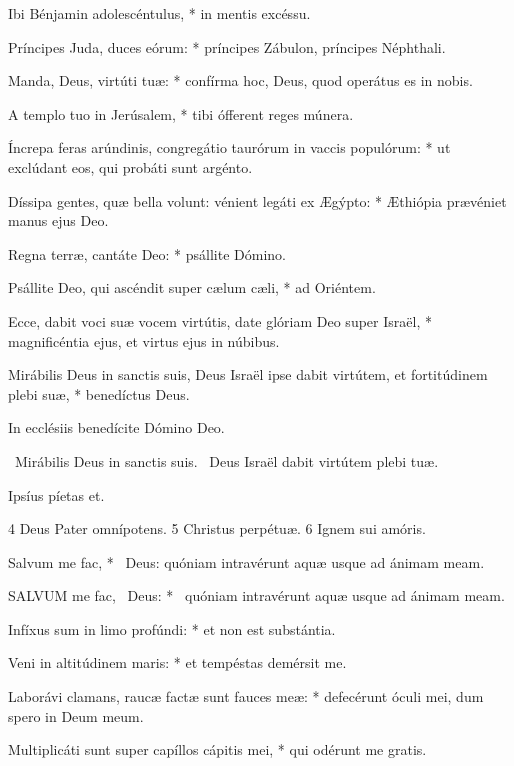 Ibi Bénjamin adolescéntulus, * in mentis excéssu.

Príncipes Juda, duces eórum: * príncipes Zábulon, príncipes Néphthali.

Manda, Deus, virtúti tuæ: * confírma hoc, Deus, quod operátus es in nobis.

A templo tuo in Jerúsalem, * tibi ófferent reges múnera.

Íncrepa feras arúndinis, congregátio taurórum in vaccis populórum: * ut exclúdant eos, qui probáti sunt argénto.

Díssipa gentes, quæ bella volunt: vénient legáti ex Ægýpto: * Æthiópia prævéniet manus ejus Deo.

Regna terræ, cantáte Deo: * psállite Dómino.

Psállite Deo, qui ascéndit super cælum cæli, * ad Oriéntem.

Ecce, dabit voci suæ vocem virtútis, date glóriam Deo super Israël, * magnificéntia ejus, et virtus ejus in núbibus.

Mirábilis Deus in sanctis suis, Deus Israël ipse dabit virtútem, et fortitúdinem plebi suæ, * benedíctus Deus.

 In ecclésiis benedícite Dómino Deo.


\V\ Mirábilis Deus in sanctis suis. \R\ Deus Israël dabit virtútem plebi tuæ.

 Ipsíus píetas et.

 4 Deus Pater omnípotens. 5 Christus perpétuæ. 6 Ignem sui amóris.


 Salvum me fac, * \textdagger\ Deus: quóniam intravérunt aquæ usque ad ánimam meam. \textdaggerdbl


\lettrine[lines=2]{S}{ALVUM} me fac, \textdagger\ Deus: * \textdaggerdbl\ quóniam intravérunt aquæ usque ad ánimam meam.

Infíxus sum in limo profúndi: * et non est substántia.

Veni in altitúdinem maris: * et tempéstas demérsit me.

Laborávi clamans, raucæ factæ sunt fauces meæ: * defecérunt óculi mei, dum spero in Deum meum.

Multiplicáti sunt super capíllos cápitis mei, * qui odérunt me gratis.

